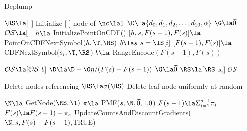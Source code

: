 \begin{algorithm}
    \caption{Deplump} \label{alg}
    \begin{algorithmic}[1]
    
		\State $\RS \la [$ $]  $ 
		\State Initialize $[$ $]$ node of \T {}
		\State $\nc \la 1$ 
		\State $\D \la  \{ d_0, d_1, d_2, \dots, d_{10}, \alpha \}$ 
		\State $\G \la \vec 0$ 
		\State $\mathcal{O}\mathcal{S} \la  [$ $]$ 
			\State $h \la $ InitializePointOnCDF(\IS)
		\EndIf
				\State $[h, s, F(s-1), F(s)] \la $PointOnCDFNextSymbol$(h,\T,\RS)$
				\State $b \la s$
			\Else
				\State $s = \IS[i]$
				\State $[F(s-1), F(s)] \la $ CDFNextSymbol($s_i,\T,\RS$)
				\State $b \la$ RangeEncode$(F(s-1), F(s))$
			\EndIf
			
			\State $\mathcal{O}\mathcal{S} \la [\mathcal{O}\mathcal{S}$ $b]$ 
			\State $\D \la \D + \G \eta / (F(s) - F(s-1))$ 
			\State $\G \la \vec 0$ 
			\State $\RS \la [\RS$ $s_i]$ 
		\EndFor
		\State \Return $\mathcal{O}\mathcal{S}$
	\EndProcedure
	
			\State Delete nodes referencing \RS[0]
			\State $\RS \la \sigma(\RS)$
		\EndWhile
			\State Delete leaf node uniformly at random
		\EndWhile
		
		\State $\N \la$ GetNode$(\RS, \T)$
		\State $\pi \la$ PMF($s, \N, \vec 0, 1.0$) 
		\State $F(s-1) \la \Sigma_{i = 1}^{s-1} \pi_i$
		\State $F(s) \la  F(s-1) + \pi_s$
		\State UpdateCountsAndDiscountGradients($\N,s,F(s) - F(s-1),$TRUE)
		\State \Return [$F(s-1), F(s)$]
	\EndFunction
	

	
	 \end{algorithmic}
\end{algorithm}

